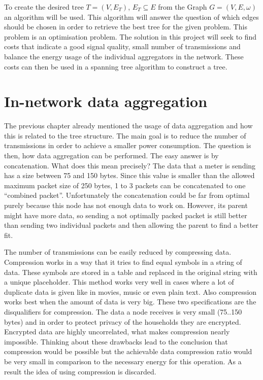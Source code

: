 To create the desired tree $T=(V,E_T)$, $E_T {\subseteq} E$ from the Graph $G=(V,E,\omega)$ an algorithm will be used. This algorithm will answer the question of which edges should be chosen in order to retrieve the best tree for the given problem. This problem is an optimisation problem. The solution in this project will seek to find costs that indicate a good signal quality, small number of transmissions and balance the energy usage of the individual aggregators in the network. These costs can then be used in a spanning tree algorithm to construct a tree.

\section{In-network data aggregation}
The previous chapter already mentioned the usage of data aggregation and how this is related to the tree structure. The main goal is to reduce the number of transmissions in order to achieve a smaller power consumption. The question is then, how data aggregation can be performed. The easy answer is by concatenation. What does this mean precisely? The data that a meter is sending has a size between 75 and 150 bytes. Since this value is smaller than the allowed maximum packet size of 250 bytes, 1 to 3 packets can be concatenated to one ``combined packet''. Unfortunately the concatenation could be far from optimal purely because this node has not enough data to work on. However, its parent might have more data, so sending a not optimally packed packet is still better than sending two individual packets and then allowing the parent to find a better fit.

The number of transmissions can be easily reduced by compressing data. Compression works in a way that it tries to find equal symbols in a string of data. These symbols are stored in a table and replaced in the original string with a unique placeholder. This method works very well in cases where a lot of duplicate data is given like in movies, music or even plain text. Also compression works best when the amount of data is very big. These two specifications are the disqualifiers for compression. The data a node receives is very small (75..150 bytes) and in order to protect privacy of the households they are encrypted. Encrypted data are highly uncorrelated, what makes compression nearly impossible. Thinking about these drawbacks lead to the conclusion that compression would be possible but the achievable data compression ratio would be very small in comparison to the necessary energy for this operation. As a result the idea of using compression is discarded.

